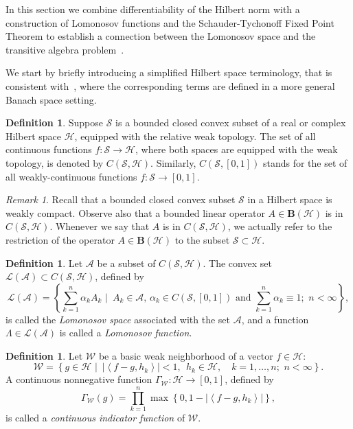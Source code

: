 \documentclass{tran-l}
\theoremstyle{definition}
\newtheorem{defn}[thm]{Definition}
\theoremstyle{remark}
\newtheorem{rem}[thm]{Remark}
\numberwithin{equation}{subsection}
\newcommand{\To}{\longrightarrow}
\newcommand{\h}{\mathcal{H}}
\newcommand{\s}{\mathcal{S}}
\newcommand{\A}{\mathcal{A}}
\newcommand{\W}{\mathcal{W}}
\newcommand{\BH}{\mathbf{B}(\mathcal{H})}
\newcommand{\Lom}{\mathcal{L}}
\newcommand{\abs}[1]{\left\vert#1\right\vert}
\newcommand{\set}[1]{\left\{#1\right\}}
\newcommand{\seq}[1]{\left<#1\right>}
\begin{document}
In this section we combine differentiability of the Hilbert norm with a construction of Lomonosov functions and the Schauder-Tychonoff Fixed Point Theorem to establish a connection between the Lomonosov space and the transitive algebra problem~\cite{RR73}.

We start by briefly introducing a simplified Hilbert space terminology, that is consistent with~\cite{Sim96a}, where the corresponding terms are defined in a more general Banach space setting.

\begin{defn}
Suppose $\s$ is a bounded closed convex subset of a real or complex Hilbert space $\h$, equipped with the relative weak topology. The set of all continuous functions $f\colon\s\To\h$, where both spaces are equipped with the weak topology, is denoted by $C(\s,\h)$. Similarly, $C(\s,[0,1])$ stands for the set of all weakly-continuous functions $f\colon\s\To[0,1]$.
\end{defn}

\begin{rem}
Recall that a bounded closed convex subset $\s$ in a Hilbert space is weakly compact. Observe also that a bounded linear operator $A\in\BH$ is in $C(\s,\h)$. Whenever we say that $A$ is in $C(\s,\h)$, we actually refer to the restriction of the operator $A\in\BH$ to the subset $\s\subset\h$.
\end{rem}

\begin{defn}
Let $\A$ be a subset of $C(\s,\h)$. The convex set $\Lom(\A) \subset C(\s,\h)$, defined by
\[ \Lom(\A) = \set{ \sum_{k=1}^n \alpha_k A_k\,\,|\,\,\, A_k\in\A,\,
 \alpha_k\in C(\s,[0,1]) \text{ and } \sum_{k=1}^n\alpha_k \equiv 1;
 \,\, n < \infty}, \]
is called the \emph{Lomonosov space} associated with the set $\A$, and a function $\Lambda\in\Lom(\A)$ is called a \emph{Lomonosov function}.
\end{defn}

\begin{defn}
Let $\W$ be a basic weak neighborhood of a vector $f\in\h$:
\begin{equation}\label{e:WeakBase}
  \W=\set{g\in\h\,\,|\,\,\,\abs{\seq{f-g,h_k}} < 1, ~~ h_k\in\h,
  \quad k=1,\ldots,n; \,\, n < \infty}.
\end{equation}
A continuous nonnegative function $\Gamma_\W\colon\h\To[0,1]$, defined by
\begin{equation}\label{e:CIF}
  \Gamma_\W(g)= \prod_{k=1}^n \max\set{0,1-\abs{\seq{f-g,h_k}}},
\end{equation}
is called a \emph{continuous indicator function} of $\W$.
\end{defn}
\end{document}
